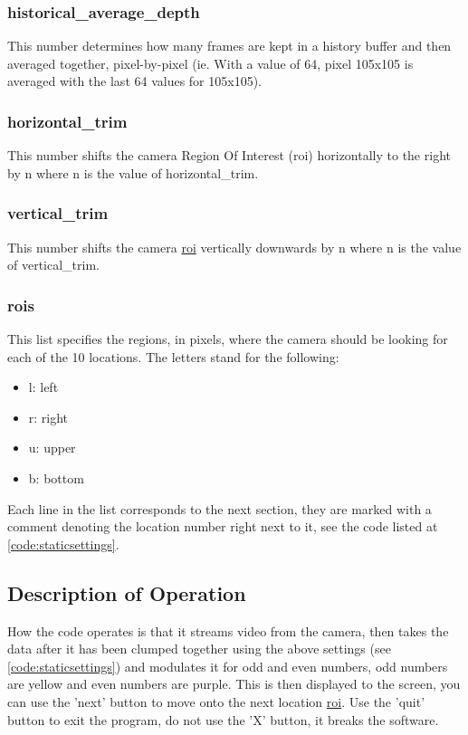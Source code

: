 \documentclass{article}
\begin{document}
					\subsubsection{historical\_average\_depth}
						This number determines how many frames are kept in a history buffer and then averaged together, pixel-by-pixel (ie. With a value of 64, pixel 105x105 is averaged with the last 64 values for 105x105).
						
					\subsubsection{horizontal\_trim}
						This number shifts the camera \hypertarget{roi}{Region Of Interest (roi)} horizontally to the right by n where n is the value of horizontal\_trim.
						
					\subsubsection{vertical\_trim}
						This number shifts the camera \hyperlink{roi}{roi} vertically downwards by n where n is the value of vertical\_trim.
						
					\subsubsection{rois}
						This list specifies the regions, in pixels, where the camera should be looking for each of the 10 locations. The letters stand for the following:
						\begin{itemize}
							\item l: left
							\item r: right
							\item u: upper
							\item b: bottom
						\end{itemize}
						Each line in the list corresponds to the next section, they are marked with a comment denoting the location number right next to it, see the code listed at \ref{code:staticsettings}.
						
				\subsection{Description of Operation}
					How the code operates is that it streams video from the camera, then takes the data after it has been clumped together using the above settings (see \ref{code:staticsettings}) and modulates it for odd and even numbers, odd numbers are yellow and even numbers are purple. This is then displayed to the screen, you can use the 'next' button to move onto the next location \hyperlink{roi}{roi}. Use the 'quit' button to exit the program, do not use the 'X' button, it breaks the software.
					
\end{document}
